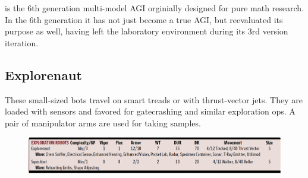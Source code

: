 
\characterHeading{\egr{}}

\texttt{\egr{}}\index{\egr{}} is the 6th generation multi-model \gls{AGI} orginially designed for pure math research. In the 6th generation it has not just become a true \gls{AGI}, but reevaluated its purpose as well, having left the laboratory environment during its 3rd version iteration.


\subsection{Explorenaut}

These small-sized bots travel on smart treads or with thrust-vector jets. They are loaded with sensors and favored for gatecrashing and similar exploration ops. A pair of manipulator arms are used for taking samples. \citep[pg. 347]{ep2e_1.1_2019}

\begin{figure}[h]
    \includegraphics[width=\textwidth]{img/explorationRobots.png}
\end{figure}

